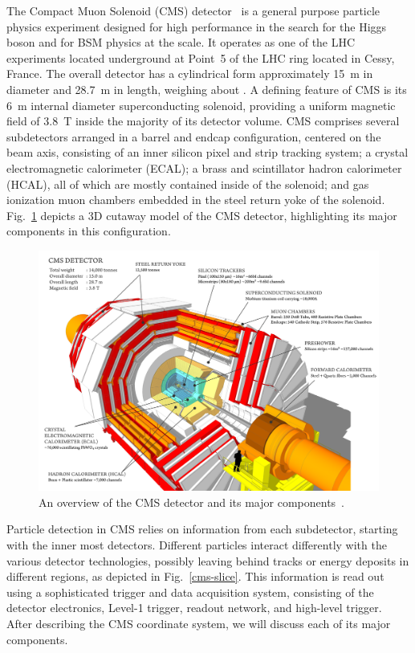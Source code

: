 The Compact Muon Solenoid (CMS) detector~\cite{Chatrchyan:2008aa} is a general purpose particle physics experiment designed for high performance in the search for the Higgs boson and for BSM physics at the {\TeVns} scale. It operates as one of the LHC experiments located underground at Point~5 of the LHC ring located in Cessy, France. The overall detector has a cylindrical form approximately 15~m in diameter and 28.7~m in length, weighing about . A defining feature of CMS is its 6~m internal diameter superconducting solenoid, providing a uniform magnetic field of 3.8~T inside the majority of its detector volume. CMS comprises several subdetectors arranged in a barrel and endcap configuration, centered on the beam axis, consisting of an inner silicon pixel and strip tracking system; a crystal electromagnetic calorimeter (ECAL); a brass and scintillator hadron calorimeter (HCAL), all of which are mostly contained inside of the solenoid; and gas ionization muon chambers embedded in the steel return yoke of the solenoid. Fig.~\ref{CMS} depicts a 3D cutaway model of the CMS detector, highlighting its major components in this configuration.

\begin{figure}[!htb]
	\centering
	\includegraphics[width=1.0\textwidth]{figures/cms_sketchup}
	\caption{An overview of the CMS detector and its major components~\cite{Sakuma:2013jqa}.}
	\label{CMS}
\end{figure}

Particle detection in CMS relies on information from each subdetector, starting with the inner most detectors. Different particles interact differently with the various detector technologies, possibly leaving behind tracks or energy deposits in different regions, as depicted in Fig.~\ref{cms-slice}. This information is read out using a sophisticated trigger and data acquisition system, consisting of the detector electronics, Level-1 trigger, readout network, and high-level trigger. After describing the CMS coordinate system, we will discuss each of its major components.

